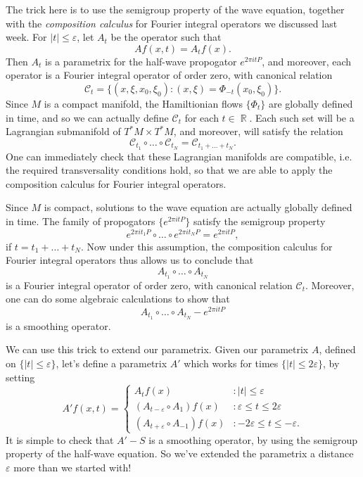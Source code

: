 \documentclass{article}
\theoremstyle{plain}
\theoremstyle{remark}
\theoremstyle{definition}
\DeclareMathOperator{\RR}{\mathbb{R}}
\begin{document}
The trick here is to use the semigroup property of the wave equation, together with the \emph{composition calculus} for Fourier integral operators we discussed last week. For $|t| \leq \varepsilon$, let $A_t$ be the operator such that
%
\[ Af(x,t) = A_tf(x). \]
%
Then $A_t$ is a parametrix for the half-wave propogator $e^{2 \pi i t P}$, and moreover, each operator is a Fourier integral operator of order zero, with canonical relation
%
\[ \mathcal{C}_t = \Big\{ (x,\xi,x_0,\xi_0) : (x,\xi) = \Phi_{-t}(x_0,\xi_0) \Big\}. \]
%
Since $M$ is a compact manifold, the Hamiltionian flows $\{ \Phi_t \}$ are globally defined in time, and so we can actually define $\mathcal{C}_t$ for each $t \in \RR$. Each such set will be a Lagrangian submanifold of $T^* M \times T^* M$, and moreover, will satisfy the relation
%
\[ \mathcal{C}_{t_1} \circ \dots \circ \mathcal{C}_{t_N} = \mathcal{C}_{t_1 + \dots + t_N}. \]
%
One can immediately check that these Lagrangian manifolds are compatible, i.e. the required transversality conditions hold, so that  we are able to apply the composition calculus for Fourier integral operators.

Since $M$ is compact, solutions to the wave equation are actually globally defined in time. The family of propogators $\{ e^{2 \pi i t P} \}$ satisfy the semigroup property
%
\[ e^{2 \pi i t_1 P} \circ \dots \circ e^{2 \pi i t_N P} = e^{2 \pi i t P}, \]
%
if $t = t_1 + \dots + t_N$. Now under this assumption, the composition calculus for Fourier integral operators thus allows us to conclude that
%
\[ A_{t_1} \circ \dots \circ A_{t_N} \]
%
is a Fourier integral operator of order zero, with canonical relation $\mathcal{C}_t$. Moreover, one can do some algebraic calculations to show that
%
\[ A_{t_1} \circ \dots \circ A_{t_N} - e^{2 \pi i t P} \]
%
is a smoothing operator.

We can use this trick to extend our parametrix. Given our parametrix $A$, defined on $\{ |t| \leq \varepsilon \}$, let's define a parametrix $A'$ which works for times $\{ |t| \leq 2 \varepsilon \}$, by setting
%
\[ A' f(x,t) = \begin{cases} A_t f(x) &: |t| \leq \varepsilon \\ (A_{t - \varepsilon} \circ A_1)f(x) &: \varepsilon \leq t \leq 2\varepsilon \\ (A_{t + \varepsilon} \circ A_{-1})f(x) &: -2\varepsilon \leq t \leq - \varepsilon. \end{cases} \]
%
It is simple to check that $A' - S$ is a smoothing operator, by using the semigroup property of the half-wave equation. So we've extended the parametrix a distance $\varepsilon$ more than we started with!
\end{document}

